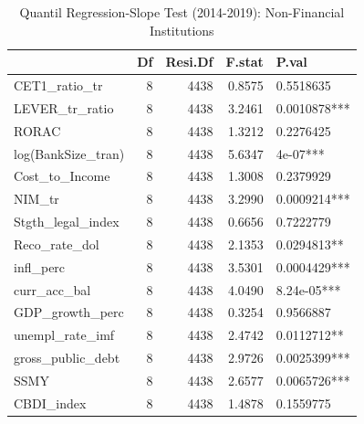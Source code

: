 \begin{table}[ht]
\centering
\caption{Quantil Regression-Slope Test (2014-2019): Non-Financial Institutions} 
\begingroup\small
\begin{tabular}{lrrrl}
  \toprule
 & Df & Resi.Df & F.stat & P.val \\ 
  \midrule
CET1\_ratio\_tr & 8 & 4438 & 0.8575 & 0.5518635 \\ 
  LEVER\_tr\_ratio & 8 & 4438 & 3.2461 & 0.0010878*** \\ 
  RORAC & 8 & 4438 & 1.3212 & 0.2276425 \\ 
  log(BankSize\_tran) & 8 & 4438 & 5.6347 & 4e-07*** \\ 
  Cost\_to\_Income & 8 & 4438 & 1.3008 & 0.2379929 \\ 
  NIM\_tr & 8 & 4438 & 3.2990 & 0.0009214*** \\ 
  Stgth\_legal\_index & 8 & 4438 & 0.6656 & 0.7222779 \\ 
  Reco\_rate\_dol & 8 & 4438 & 2.1353 & 0.0294813** \\ 
  infl\_perc & 8 & 4438 & 3.5301 & 0.0004429*** \\ 
  curr\_acc\_bal & 8 & 4438 & 4.0490 & 8.24e-05*** \\ 
  GDP\_growth\_perc & 8 & 4438 & 0.3254 & 0.9566887 \\ 
  unempl\_rate\_imf & 8 & 4438 & 2.4742 & 0.0112712** \\ 
  gross\_public\_debt & 8 & 4438 & 2.9726 & 0.0025399*** \\ 
  SSMY & 8 & 4438 & 2.6577 & 0.0065726*** \\ 
  CBDI\_index & 8 & 4438 & 1.4878 & 0.1559775 \\ 
   \bottomrule
\end{tabular}
\endgroup
\end{table}
